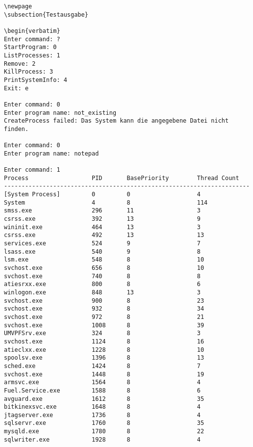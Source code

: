 \documentclass[12pt,a4paper]{article}
\begin{document}
{\begin {verbatim}
\newpage
\subsection{Testausgabe}

\begin{verbatim}
Enter command: ?
StartProgram: 0
ListProcesses: 1
Remove: 2
KillProcess: 3
PrintSystemInfo: 4
Exit: e

Enter command: 0
Enter program name: not_existing
CreateProcess failed: Das System kann die angegebene Datei nicht finden.

Enter command: 0
Enter program name: notepad

Enter command: 1
Process                  PID       BasePriority        Thread Count
----------------------------------------------------------------------
[System Process]         0         0                   4
System                   4         8                   114
smss.exe                 296       11                  3
csrss.exe                392       13                  9
wininit.exe              464       13                  3
csrss.exe                492       13                  13
services.exe             524       9                   7
lsass.exe                540       9                   8
lsm.exe                  548       8                   10
svchost.exe              656       8                   10
svchost.exe              740       8                   8
atiesrxx.exe             800       8                   6
winlogon.exe             848       13                  3
svchost.exe              900       8                   23
svchost.exe              932       8                   34
svchost.exe              972       8                   21
svchost.exe              1008      8                   39
UMVPFSrv.exe             324       8                   3
svchost.exe              1124      8                   16
atieclxx.exe             1228      8                   10
spoolsv.exe              1396      8                   13
sched.exe                1424      8                   7
svchost.exe              1448      8                   19
armsvc.exe               1564      8                   4
Fuel.Service.exe         1588      8                   6
avguard.exe              1612      8                   35
bitkinexsvc.exe          1648      8                   4
jtagserver.exe           1736      8                   4
sqlservr.exe             1760      8                   35
mysqld.exe               1780      8                   22
sqlwriter.exe            1928      8                   4

\end{verbatim}}
\end{document}
